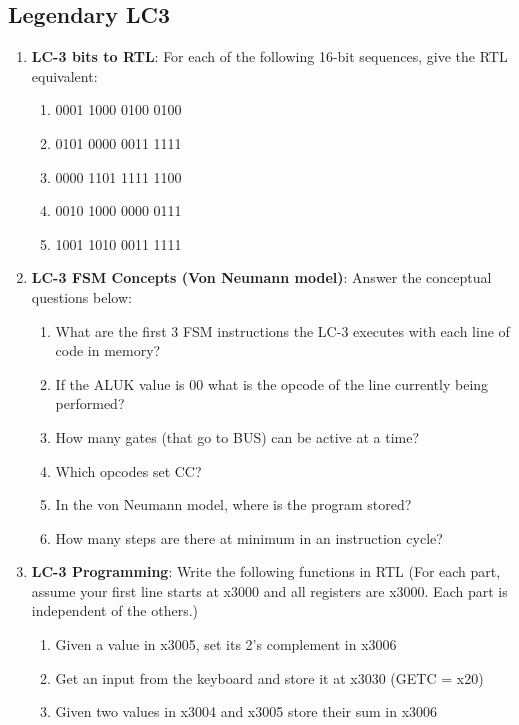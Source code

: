 \documentclass{article}
\begin{document}
\begin{enumerate}[label=(\alph*)]
\section{Legendary LC3}
    \begin{enumerate}[label=(\alph*)]
        \item \textbf{LC-3 bits to RTL}: For each of the following 16-bit sequences, give the RTL equivalent:
        \begin{enumerate}[label=(\roman*),itemsep = 10pt]
            \item 0001 1000 0100 0100
            \item 0101 0000 0011 1111
            \item 0000 1101 1111 1100 
            \item 0010 1000 0000 0111
            \item 1001 1010 0011 1111
        \end{enumerate}
        \newpage
        \item \textbf{LC-3 FSM Concepts (Von Neumann model)}: Answer the conceptual questions below:
        \begin{enumerate}[label=(\roman*),itemsep = 10pt]
            \item What are the first 3 FSM instructions the LC-3 executes with each line of code in memory?
            \item If the ALUK value is 00 what is the opcode of the line currently being performed?
            \item How many gates (that go to BUS) can be active at a time?
            \item Which opcodes set CC?
            \item In the von Neumann model, where is the program stored?
            \item How many steps are there at minimum in an instruction cycle?
        \end{enumerate}
        \item \textbf{LC-3 Programming}: Write the following functions in RTL (For each part, assume your first line starts at x3000 and all registers are x3000. Each part is independent of the others.)
        \begin{enumerate}[label=(\roman*),itemsep = 10pt]
            \item Given a value in x3005, set its 2’s complement in x3006
            \item Get an input from the keyboard and store it at x3030 (GETC = x20)
            \item Given two values in x3004 and x3005 store their sum in x3006

\end{enumerate}
\end{enumerate}
\end{enumerate}
\end{document}
